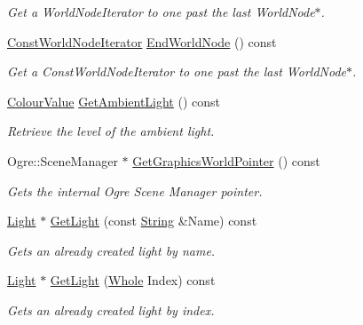 \begin{DoxyCompactItemize}
\begin{DoxyCompactList}\small\item\em Get a WorldNodeIterator to one past the last WorldNode$\ast$. \item\end{DoxyCompactList}\item 
\hyperlink{classphys_1_1SceneManager_aa893eadb43492c0a4a9cafe2d150742c}{ConstWorldNodeIterator} \hyperlink{classphys_1_1SceneManager_a78b89a81744dbc32b8723da55734c279}{EndWorldNode} () const 
\begin{DoxyCompactList}\small\item\em Get a ConstWorldNodeIterator to one past the last WorldNode$\ast$. \item\end{DoxyCompactList}\item 
\hyperlink{classphys_1_1ColourValue}{ColourValue} \hyperlink{classphys_1_1SceneManager_a4ab204cf9bdfe267561ba2710108c68f}{GetAmbientLight} () const 
\begin{DoxyCompactList}\small\item\em Retrieve the level of the ambient light. \item\end{DoxyCompactList}\item 
Ogre::SceneManager $\ast$ \hyperlink{classphys_1_1SceneManager_aa6bfec6329ecfb7c6196f488e1499c3c}{GetGraphicsWorldPointer} () const 
\begin{DoxyCompactList}\small\item\em Gets the internal Ogre Scene Manager pointer. \item\end{DoxyCompactList}\item 
\hyperlink{classphys_1_1Light}{Light} $\ast$ \hyperlink{classphys_1_1SceneManager_a00849466a4248d71f7e1ecfd5a07a89c}{GetLight} (const \hyperlink{namespacephys_aa03900411993de7fbfec4789bc1d392e}{String} \&Name) const 
\begin{DoxyCompactList}\small\item\em Gets an already created light by name. \item\end{DoxyCompactList}\item 
\hyperlink{classphys_1_1Light}{Light} $\ast$ \hyperlink{classphys_1_1SceneManager_a3c5aaeb80eed8032d6f9417073d2be8b}{GetLight} (\hyperlink{namespacephys_a460f6bc24c8dd347b05e0366ae34f34a}{Whole} Index) const 
\begin{DoxyCompactList}\small\item\em Gets an already created light by index. \item\end{DoxyCompactList}\item 

\end{DoxyCompactItemize}
